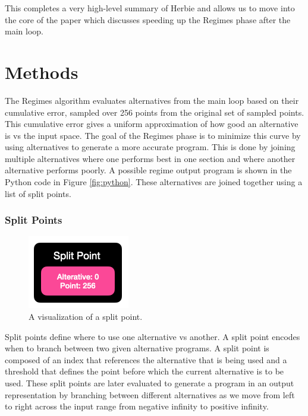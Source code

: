 \documentclass{article}
\begin{document}
This completes a very high-level summary of Herbie and allows us to move into the core of the paper which discusses speeding up the Regimes phase after the main loop.

\section{Methods}
The Regimes algorithm evaluates alternatives from the main loop based on their cumulative error, sampled over 256 points from the original set of sampled points. This cumulative error gives a uniform approximation of how good an alternative is vs the input space. The goal of the Regimes phase is to minimize this curve by using alternatives to generate a more accurate program. This is done by joining multiple alternatives where one performs best in one section and where another alternative performs poorly.  A possible regime output program is shown in the Python code in Figure \ref{fig:python}. These alternatives are joined together using a list of split points.

\subsubsection{Split Points}

\begin{figure}[htbp]
\begin{center}
\includegraphics[scale=0.60]{split-point.png}
\caption{A visualization of a split point.}
\label{fig:split-point}
\end{center}
\end{figure}

Split points define where to use one alternative vs another. A split point encodes when to branch between two given alternative programs. A split point is composed of an index that references the alternative that is being used and a threshold that defines the point before which the current alternative is to be used. These split points are later evaluated to generate a program in an output representation by branching between different alternatives as we move from left to right across the input range from negative infinity to positive infinity.
\end{document}
